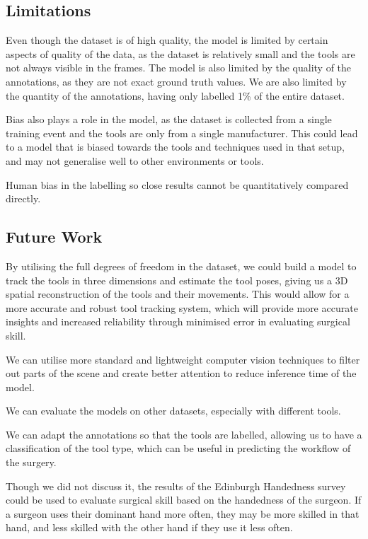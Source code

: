 \subsection{Limitations}

Even though the dataset is of high quality, the model is limited by certain aspects of quality of the data, as the dataset is relatively small and the tools are not always visible in the frames. The model is also limited by the quality of the annotations, as they are not exact ground truth values. We are also limited by the quantity of the annotations, having only labelled 1\% of the entire dataset.

Bias also plays a role in the model, as the dataset is collected from a single training event and the tools are only from a single manufacturer. This could lead to a model that is biased towards the tools and techniques used in that setup, and may not generalise well to other environments or tools.

Human bias in the labelling so close results cannot be quantitatively compared directly.

\subsection{Future Work}

By utilising the full degrees of freedom in the dataset, we could build a model to track the tools in three dimensions and estimate the tool poses, giving us a 3D spatial reconstruction of the tools and their movements. This would allow for a more accurate and robust tool tracking system, which will provide more accurate insights and increased reliability through minimised error in evaluating surgical skill.

We can utilise more standard and lightweight computer vision techniques to filter out parts of the scene and create better attention to reduce inference time of the model.

We can evaluate the models on other datasets, especially with different tools.

We can adapt the annotations so that the tools are labelled, allowing us to have a classification of the tool type, which can be useful in predicting the workflow of the surgery.

Though we did not discuss it, the results of the Edinburgh Handedness survey \cite{oldfield_assessment_1971} could be used to evaluate surgical skill based on the handedness of the surgeon. If a surgeon uses their dominant hand more often, they may be more skilled in that hand, and less skilled with the other hand if they use it less often.

